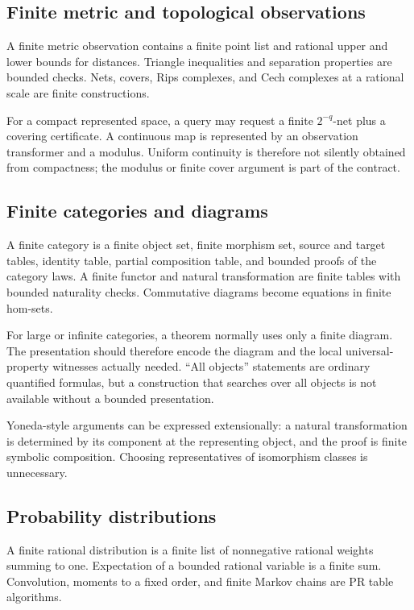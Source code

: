 \subsection{Finite metric and topological observations}

A finite metric observation contains a finite point list and rational upper and
lower bounds for distances.  Triangle inequalities and separation properties
are bounded checks.  Nets, covers, Rips complexes, and Cech complexes at a
rational scale are finite constructions.

For a compact represented space, a query may request a finite
\(2^{-q}\)-net plus a covering certificate.  A continuous map is represented by
an observation transformer and a modulus.  Uniform continuity is therefore not
silently obtained from compactness; the modulus or finite cover argument is
part of the contract.

\subsection{Finite categories and diagrams}

A finite category is a finite object set, finite morphism set, source and target
tables, identity table, partial composition table, and bounded proofs of the
category laws.  A finite functor and natural transformation are finite tables
with bounded naturality checks.  Commutative diagrams become equations in
finite hom-sets.

For large or infinite categories, a theorem normally uses only a finite
diagram.  The presentation should therefore encode the diagram and the local
universal-property witnesses actually needed.  ``All objects'' statements are
ordinary quantified formulas, but a construction that searches over all
objects is not available without a bounded presentation.

Yoneda-style arguments can be expressed extensionally: a natural
transformation is determined by its component at the representing object, and
the proof is finite symbolic composition.  Choosing representatives of
isomorphism classes is unnecessary.

\subsection{Probability distributions}

A finite rational distribution is a finite list of nonnegative rational weights
summing to one.  Expectation of a bounded rational variable is a finite sum.
Convolution, moments to a fixed order, and finite Markov chains are PR table
algorithms.


